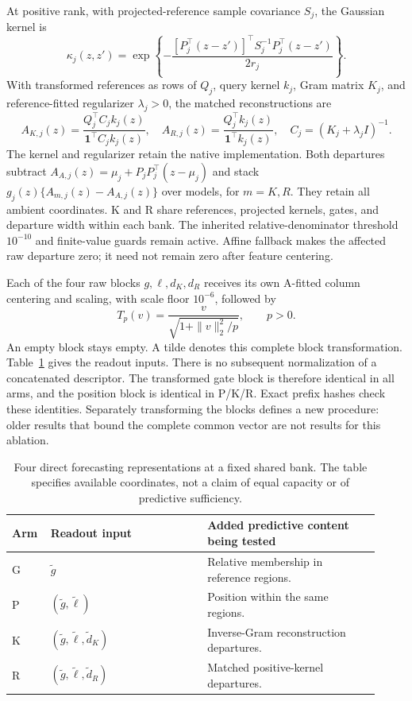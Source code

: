 At positive rank, with projected-reference sample covariance $S_j$,
the Gaussian kernel is
\[
 \kappa_j(z,z')=\exp\!\left\{
 -\frac{[P_j^\top(z-z')]^\top S_j^{-1}P_j^\top(z-z')}{2r_j}
 \right\}.
\]
With transformed references as rows of $Q_j$, query kernel $k_j$,
Gram matrix $K_j$, and reference-fitted regularizer $\lambda_j>0$,
the matched reconstructions are
\[
 A_{K,j}(z)=\frac{Q_j^\top C_jk_j(z)}{\mathbf1^\top C_jk_j(z)},
 \quad A_{R,j}(z)=\frac{Q_j^\top k_j(z)}{\mathbf1^\top k_j(z)},
 \quad C_j=(K_j+\lambda_jI)^{-1}.
\]
The kernel and regularizer retain the native implementation. Both
departures subtract
$A_{A,j}(z)=\mu_j+P_jP_j^\top(z-\mu_j)$ and stack
$g_j(z)\{A_{m,j}(z)-A_{A,j}(z)\}$ over models, for $m=K,R$.
They retain all ambient coordinates. K and R share references, projected
kernels, gates, and departure width within each bank.
The inherited relative-denominator threshold $10^{-10}$ and finite-value
guards remain active. Affine fallback makes the affected raw departure
zero; it need not remain zero after feature centering.

Each of the four raw blocks $g,\ell,d_K,d_R$ receives its own A-fitted
column centering and scaling, with scale floor $10^{-6}$, followed by
\begin{equation}
 T_p(v)=\frac{v}{\sqrt{1+\|v\|_2^2/p}},\qquad p>0.
 \label{eq:supp-sa-block-map}
\end{equation}
An empty block stays empty. A tilde denotes this complete block
transformation. Table~\ref{supp:sa-architecture} gives the readout inputs.
There is no subsequent normalization of a concatenated descriptor.
The transformed gate block is therefore identical in all arms, and
the position block is identical in P/K/R. Exact prefix hashes check
these identities. Separately transforming the blocks defines a new
procedure: older results that bound the complete common vector are not
results for this ablation.

\begin{table}[t]
\centering\small
\caption{Four direct forecasting representations at a fixed shared bank.
The table specifies available coordinates, not a claim of equal capacity
or of predictive sufficiency.}
\label{supp:sa-architecture}
\begin{tabular}{@{}p{0.08\linewidth}p{0.40\linewidth}p{0.44\linewidth}@{}}
\toprule
Arm & Readout input & Added predictive content being tested \\
\midrule
G & $\widetilde g$ & Relative membership in reference regions. \\
P & $(\widetilde g,\widetilde\ell)$ & Position within the same regions. \\
K & $(\widetilde g,\widetilde\ell,\widetilde d_K)$ & Inverse-Gram reconstruction departures. \\
R & $(\widetilde g,\widetilde\ell,\widetilde d_R)$ & Matched positive-kernel departures. \\
\bottomrule
\end{tabular}
\end{table}

